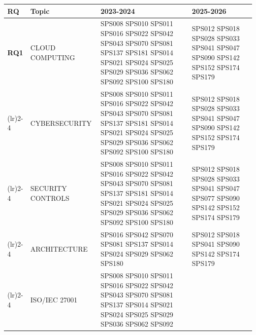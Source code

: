 \begin{table}[htbp]
	\centering
	\setlength{\tabcolsep}{2pt}
	\begin{tabularx}{\textwidth}{p{0.8cm}p{2.5cm}>{\raggedright\arraybackslash}X>{\raggedright\arraybackslash}X}
		\toprule
		\textbf{RQ}                          & \textbf{Topic}  & \textbf{2023-2024}                         	& \textbf{2025-2026}                                         \\
		\midrule
		\multirow{0}{*}[0em]{\textbf{RQ1}}  & CLOUD COMPUTING  & SPS008 SPS010 SPS011 SPS016 SPS022 SPS042 
																 SPS043 SPS070 SPS081 SPS137 SPS181 SPS014 
																 SPS021 SPS024 SPS025 SPS029 SPS036 SPS062 
																 SPS092 SPS100 SPS180                   		& SPS012 SPS018 SPS028 SPS033 SPS041 SPS047 
																												  SPS090 SPS142 SPS152 SPS174 SPS179                          \\
		\addlinespace[0.3em]
		\cmidrule(lr){2-4}	
		                                     & CYBERSECURITY 	& SPS008 SPS010 SPS011 SPS016 SPS022 SPS042 
																  SPS043 SPS070 SPS081 SPS137 SPS181 SPS014 
																  SPS021 SPS024 SPS025 SPS029 SPS036 SPS062 
																  SPS092 SPS100 SPS180                   		& SPS012 SPS018 SPS028 SPS033 SPS041 SPS047 
																												  SPS090 SPS142 SPS152 SPS174 SPS179             		      \\
		\addlinespace[0.3em]
		\cmidrule(lr){2-4}	
		                                     & SECURITY CONTROLS & SPS008 SPS010 SPS011 SPS016 SPS022 SPS042 
																   SPS043 SPS070 SPS081 SPS137 SPS181 SPS014 
																   SPS021 SPS024 SPS025 SPS029 SPS036 SPS062 
																   SPS092 SPS100 SPS180                       & SPS012 SPS018 SPS028 SPS033 SPS041 SPS047 
																												SPS077 SPS090 SPS142 SPS152 SPS174 SPS179            	   \\
		\addlinespace[0.3em]
		\cmidrule(lr){2-4}	
		                                     & ARCHITECTURE       & SPS016 SPS042 SPS070 SPS081 SPS137 SPS014 
																	SPS024 SPS029 SPS062 SPS180             	 & SPS012 SPS018 SPS041 SPS090 SPS142 SPS174 
																												   SPS179                        							\\
		\addlinespace[0.3em]
		\cmidrule(lr){2-4}	
		                                     & ISO/IEC 27001   	  & SPS008 SPS010 SPS011 SPS016 SPS022 SPS042 
																	SPS043 SPS070 SPS081 SPS137	SPS014 SPS021 
																	SPS024 SPS025 SPS029 SPS036 SPS062 SPS092 

\end{tabularx}
\end{table}
